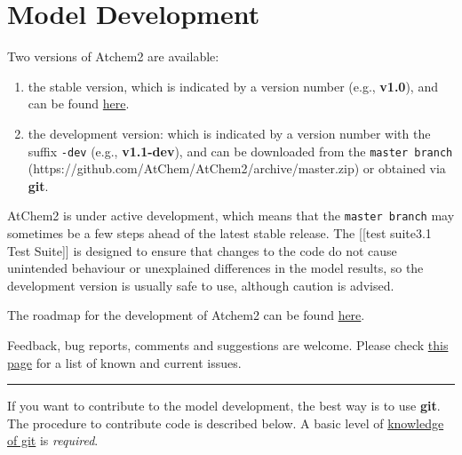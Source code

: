 \section{Model Development} \label{sec:development}

Two versions of Atchem2 are available:

\begin{enumerate}
\def\labelenumi{\arabic{enumi})}
\item
  the stable version, which is indicated by a version number (e.g.,
  \textbf{v1.0}), and can be found
  \href{https://github.com/AtChem/AtChem2/releases}{here}.
\item
  the development version: which is indicated by a version number with
  the suffix \texttt{-dev} (e.g., \textbf{v1.1-dev}), and can be
  downloaded from the \texttt{master\ branch}
  (https://github.com/AtChem/AtChem2/archive/master.zip) or obtained via
  \textbf{git}.
\end{enumerate}

AtChem2 is under active development, which means that the
\texttt{master\ branch} may sometimes be a few steps ahead of the latest
stable release. The {[}{[}test suite\textbar{}3.1 Test Suite{]}{]} is
designed to ensure that changes to the code do not cause unintended
behaviour or unexplained differences in the model results, so the
development version is usually safe to use, although caution is advised.

The roadmap for the development of Atchem2 can be found
\href{https://github.com/AtChem/AtChem2/projects/1}{here}.

Feedback, bug reports, comments and suggestions are welcome. Please
check \href{https://github.com/AtChem/AtChem2/issues}{this page} for a
list of known and current issues.

\begin{center}\rule{0.5\linewidth}{\linethickness}\end{center}

If you want to contribute to the model development, the best way is to
use \textbf{git}. The procedure to contribute code is described below. A
basic level of
\href{https://swcarpentry.github.io/git-novice/}{knowledge of git} is
\emph{required}.


